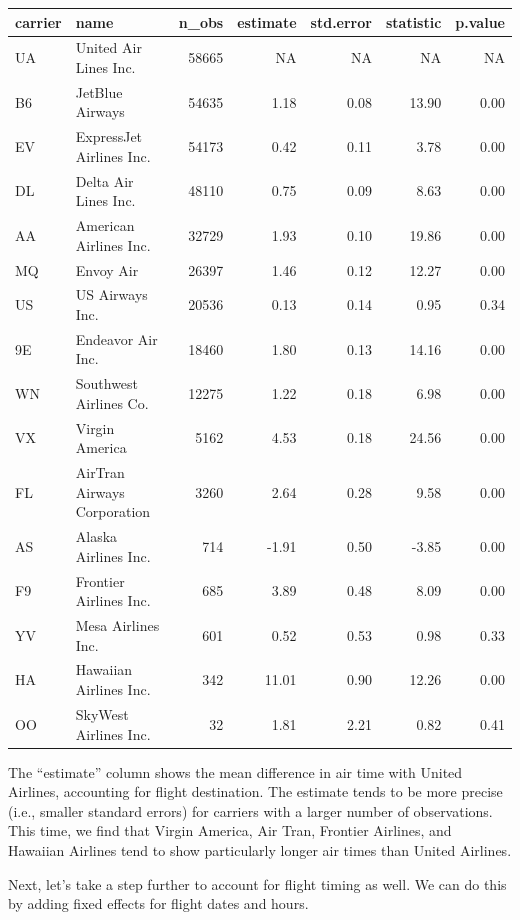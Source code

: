 \documentclass[]{book}
\theoremstyle{definition}
\theoremstyle{definition}
\theoremstyle{remark}
\begin{document}
\begin{tabular}{l|l|r|r|r|r|r}
\hline
carrier & name & n\_obs & estimate & std.error & statistic & p.value\\
\hline
UA & United Air Lines Inc. & 58665 & NA & NA & NA & NA\\
\hline
B6 & JetBlue Airways & 54635 & 1.18 & 0.08 & 13.90 & 0.00\\
\hline
EV & ExpressJet Airlines Inc. & 54173 & 0.42 & 0.11 & 3.78 & 0.00\\
\hline
DL & Delta Air Lines Inc. & 48110 & 0.75 & 0.09 & 8.63 & 0.00\\
\hline
AA & American Airlines Inc. & 32729 & 1.93 & 0.10 & 19.86 & 0.00\\
\hline
MQ & Envoy Air & 26397 & 1.46 & 0.12 & 12.27 & 0.00\\
\hline
US & US Airways Inc. & 20536 & 0.13 & 0.14 & 0.95 & 0.34\\
\hline
9E & Endeavor Air Inc. & 18460 & 1.80 & 0.13 & 14.16 & 0.00\\
\hline
WN & Southwest Airlines Co. & 12275 & 1.22 & 0.18 & 6.98 & 0.00\\
\hline
VX & Virgin America & 5162 & 4.53 & 0.18 & 24.56 & 0.00\\
\hline
FL & AirTran Airways Corporation & 3260 & 2.64 & 0.28 & 9.58 & 0.00\\
\hline
AS & Alaska Airlines Inc. & 714 & -1.91 & 0.50 & -3.85 & 0.00\\
\hline
F9 & Frontier Airlines Inc. & 685 & 3.89 & 0.48 & 8.09 & 0.00\\
\hline
YV & Mesa Airlines Inc. & 601 & 0.52 & 0.53 & 0.98 & 0.33\\
\hline
HA & Hawaiian Airlines Inc. & 342 & 11.01 & 0.90 & 12.26 & 0.00\\
\hline
OO & SkyWest Airlines Inc. & 32 & 1.81 & 2.21 & 0.82 & 0.41\\
\hline
\end{tabular}

The ``estimate'' column shows the mean difference in air time with
United Airlines, accounting for flight destination. The estimate tends
to be more precise (i.e., smaller standard errors) for carriers with a
larger number of observations. This time, we find that Virgin America,
Air Tran, Frontier Airlines, and Hawaiian Airlines tend to show
particularly longer air times than United Airlines.

Next, let's take a step further to account for flight timing as well. We
can do this by adding fixed effects for flight dates and hours.
\end{document}
